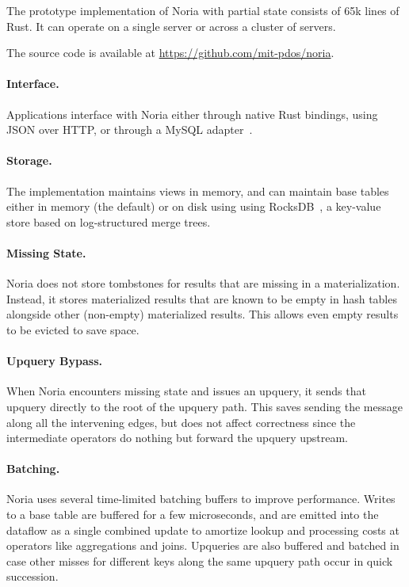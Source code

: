 The prototype implementation of Noria with partial state consists of 65k lines
of Rust. It can operate on a single server or across a cluster of servers.

The source code is available at \url{https://github.com/mit-pdos/noria}.

\paragraph{Interface.}
Applications interface with Noria either through native Rust bindings, using
JSON over HTTP, or through a MySQL adapter~\cite{noria-mysql}.

\paragraph{Storage.}
The implementation maintains views in memory, and can maintain base tables
either in memory (the default) or on disk using using RocksDB~\cite{rocksdb}, a
key-value store based on log-structured merge trees.

\paragraph{Missing State.}
Noria does not store tombstones for results that are missing in a
materialization. Instead, it stores materialized results that are known to be
empty in hash tables alongside other (non-empty) materialized results. This
allows even empty results to be evicted to save space.

\paragraph{Upquery Bypass.}
When Noria encounters missing state and issues an upquery, it sends that
upquery directly to the root of the upquery path. This saves sending the
message along all the intervening edges, but does not affect correctness since
the intermediate operators do nothing but forward the upquery upstream.

\paragraph{Batching.}
Noria uses several time-limited batching buffers to improve performance. Writes
to a base table are buffered for a few microseconds, and are emitted into the
dataflow as a single combined update to amortize lookup and processing costs at
operators like aggregations and joins. Upqueries are also buffered and batched
in case other misses for different keys along the same upquery path occur in
quick succession.

